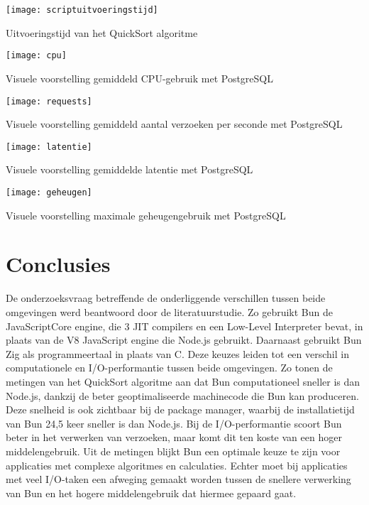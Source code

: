 \documentclass[a0,portrait]{hogent-poster}
\begin{document}
\begin{multicols}{2}
\begin{center}
\begin{minipage}{0.23\textwidth}
  \end{minipage}%
  \hfill
  \begin{minipage}{0.23\textwidth}
    \centering
    \texttt{[image: scriptuitvoeringstijd]}
    \caption{Uitvoeringstijd van het QuickSort algoritme}
  \end{minipage}%
\end{center}
\begin{center}
  \captionsetup{type=figure}
  \begin{minipage}{0.23\textwidth}
    \centering
    \texttt{[image: cpu]}
    \caption{Visuele voorstelling gemiddeld CPU-gebruik met PostgreSQL}
  \end{minipage}%
  \hfill
  \begin{minipage}{0.23\textwidth}
    \centering
    \texttt{[image: requests]}
    \caption{Visuele voorstelling gemiddeld aantal verzoeken per seconde met PostgreSQL}
  \end{minipage}%
\end{center}
\begin{center}
  \captionsetup{type=figure}
  \begin{minipage}{0.23\textwidth}
    \centering
    \texttt{[image: latentie]}
    \caption{Visuele voorstelling gemiddelde latentie met PostgreSQL}
  \end{minipage}%
  \hfill
  \begin{minipage}{0.23\textwidth}
    \centering
    \texttt{[image: geheugen]}
    \caption{Visuele voorstelling maximale geheugengebruik met PostgreSQL}
  \end{minipage}
\end{center}

\section{Conclusies}
De onderzoeksvraag betreffende de onderliggende verschillen tussen beide omgevingen werd beantwoord door de literatuurstudie.
Zo gebruikt Bun de JavaScriptCore engine, die 3 JIT compilers en een Low-Level Interpreter bevat, in plaats van de V8 JavaScript engine die Node.js gebruikt.
Daarnaast gebruikt Bun Zig als programmeertaal in plaats van C. Deze keuzes leiden tot een verschil in computationele en I/O-performantie tussen beide omgevingen.
Zo tonen de metingen van het QuickSort algoritme aan dat Bun computationeel sneller is dan Node.js, dankzij de beter geoptimaliseerde machinecode die Bun kan produceren. 
Deze snelheid is ook zichtbaar bij de package manager, waarbij de installatietijd van Bun 24,5 keer sneller is dan Node.js.
Bij de I/O-performantie scoort Bun beter in het verwerken van verzoeken, maar komt dit ten koste van een hoger middelengebruik.
Uit de metingen blijkt Bun een optimale keuze te zijn voor applicaties met complexe algoritmes en calculaties. 
Echter moet bij applicaties met veel I/O-taken een afweging gemaakt worden tussen de snellere verwerking van Bun en het hogere middelengebruik dat hiermee gepaard gaat.

\end{multicols}
\end{document}
